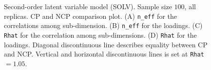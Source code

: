 %
\begin{figure}[h]
	\centering
	\begin{subfigure}
		\texttt{[image: SOLV\_100\_neff3]}
	\end{subfigure}
	\begin{subfigure}
		\texttt{[image: SOLV\_100\_Rhat3]}
	\end{subfigure}
	\caption[Second-order latent variable model (SOLV). Sample size $100$, all replicas. CP and NCP comparison plot.]%
	{Second-order latent variable model (SOLV). Sample size $100$, all replicas. CP and NCP comparison plot. (A) \texttt{n\_eff} for the correlations among sub-dimension. (B) \texttt{n\_eff} for the loadings. (C) \texttt{Rhat} for the correlation among sub-dimensions. (D) \texttt{Rhat} for the loadings. Diagonal discontinuous line describes equality between CP and NCP. Vertical and horizontal discontinuous lines is set at \texttt{Rhat}$=1.05$. }
	\label{fig:SOLV_stat2}
\end{figure}